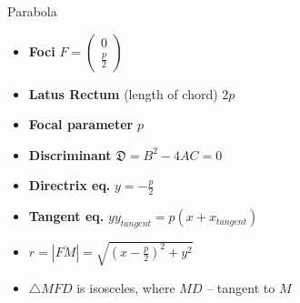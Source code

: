 \documentclass[aspectratio=169]{beamer}
\begin{document}
\begin{frame}[t]{Parabola}
\begin{multicols}{3}
\begin{itemize}
        \item \textbf{Foci} $F = \begin{pmatrix} 0\\\frac{p}{2} \end{pmatrix}$
        \item \textbf{Latus Rectum} (length of chord) $2p$
        \item \textbf{Focal parameter}  $p$
        \item \textbf{Discriminant} $\mathfrak{D} = B^2 - 4AC = 0$
        \item \textbf{Directrix eq.} $y = -\frac{p}{2}$
        \item \textbf{Tangent eq.} $yy_{tangent} = p(x+x_{tangent})$
        \item $r = |\overline{FM}|=\sqrt{(x-\frac{p}{2})^2+y^2}$
        \item $\triangle MFD$ is isosceles, where $MD$ -- tangent to $M$
        \end{itemize}
\end{multicols}
\end{frame}
\end{document}
